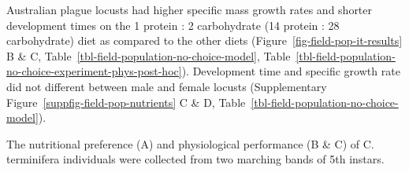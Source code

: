 \documentclass[
]{article}
\begin{document}
Australian plague locusts had higher specific mass growth rates and
shorter development times on the 1 protein : 2 carbohydrate (14 protein
: 28 carbohydrate) diet as compared to the other diets
(Figure~\ref{fig-field-pop-it-results} B \& C,
Table~\ref{tbl-field-population-no-choice-model},
Table~\ref{tbl-field-population-no-choice-experiment-phys-post-hoc}).
Development time and specific growth rate did not different between male
and female locusts
(Supplementary Figure~\ref{suppfig-field-pop-nutrients} C \& D,
Table~\ref{tbl-field-population-no-choice-model}).

\begin{fig}


\caption{\label{fig-field-pop-it-results}The nutritional preference (A)
and physiological performance (B \& C) of C. terminifera individuals
were collected from two marching bands of 5th instars.}

\end{fig}%
\end{document}
